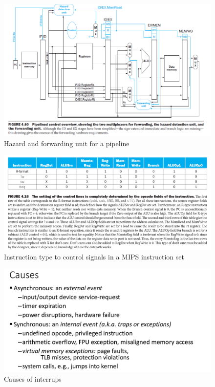 \documentclass{scrartcl}
\begin{document}
\begin{figure}[h]
\centering
\includegraphics[scale=0.6]{Images/hazard+fwding.png}
\caption{Hazard and forwarding unit for a pipeline}
\end{figure}

\begin{figure}[h]
\centering
\includegraphics[scale=0.5]{Images/inst_to_signals.png}
\caption{Instruction type to control signals in a MIPS instruction set}
\end{figure}

\begin{figure}[h]
\centering
\includegraphics[scale=0.5]{Images/interrupt_causes.png}
\caption{Causes of interrups}
\end{figure}
\end{document}
